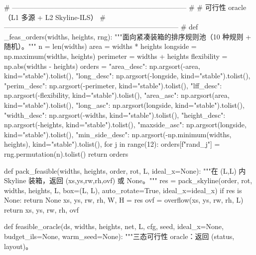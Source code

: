 \documentclass{JXUSTmodeling}
\begin{document}
\begin{appendixx}
\begin{python}
# --------------------------------------------------------------------------- #
# 可行性 oracle（L1 多源 + L2 Skyline-ILS）
# --------------------------------------------------------------------------- #
def _feas_orders(widths, heights, rng):
    """面向紧凑装箱的排序规则池（10 种规则 + 随机）。"""
    n = len(widths)
    area = widths * heights
    longside = np.maximum(widths, heights)
    perimeter = widths + heights
    flexibility = np.abs(widths - heights)
    orders = {
        "area_desc": np.argsort(-area, kind="stable").tolist(),
        "long_desc": np.argsort(-longside, kind="stable").tolist(),
        "perim_desc": np.argsort(-perimeter, kind="stable").tolist(),
        "lff_desc": np.argsort(-flexibility, kind="stable").tolist(),
        "area_asc": np.argsort(area, kind="stable").tolist(),
        "long_asc": np.argsort(longside, kind="stable").tolist(),
        "width_desc": np.argsort(-widths, kind="stable").tolist(),
        "height_desc": np.argsort(-heights, kind="stable").tolist(),
        "maxside_asc": np.argsort(longside, kind="stable").tolist(),
        "min_side_desc": np.argsort(-np.minimum(widths, heights), kind="stable").tolist(),
    }
    for j in range(12):
        orders[f"rand_{j}"] = rng.permutation(n).tolist()
    return orders


def pack_feasible(widths, heights, order, rot, L, ideal_x=None):
    """在 (L,L) 内 Skyline 装箱，返回 (xs,ys,rw,rh,ovf) 或 None。"""
    res = pack_skyline(order, rot, widths, heights, L,
                       box=(L, L), auto_rotate=True, ideal_x=ideal_x)
    if res is None:
        return None
    xs, ys, rw, rh, W, H = res
    ovf = overflow(xs, ys, rw, rh, L)
    return xs, ys, rw, rh, ovf


def feasible_oracle(ds, widths, heights, net, L, cfg, seed,
                    ideal_x=None, budget_ils=None, warm_seed=None):
    """三态可行性 oracle：返回 (status, layout)。


\end{python}
\end{appendixx}
\end{document}
